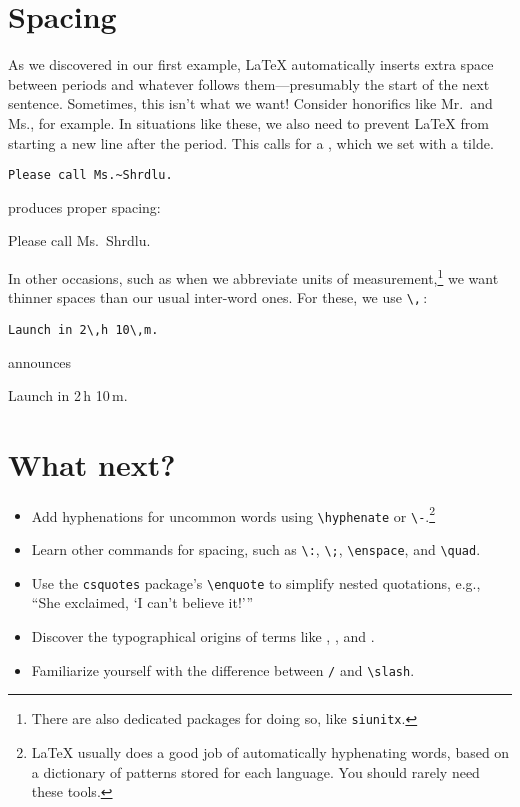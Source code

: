 \section{Spacing}

As we discovered in our first example,
\LaTeX{} automatically inserts extra space between periods and whatever
follows them---presumably the start of the next sentence.
Sometimes, this isn't what we want!
Consider honorifics like Mr.\ and Ms., for example.
In situations like these, we also need to prevent \LaTeX{} from starting a
new line after the period.
This calls for a , which we set with a tilde.
\begin{leftfigure}
\begin{lstlisting}
Please call Ms.~Shrdlu.
\end{lstlisting}
\end{leftfigure}
produces proper spacing:
\begin{leftfigure}
\lm%
Please call Ms.~Shrdlu.
\end{leftfigure}

In other occasions, such as when we abbreviate units of
measurement,\punckern\footnote{There are also dedicated packages for doing so,
like \texttt{siunitx}.}
we want thinner spaces than our usual inter-word ones.
For these, we use \verb|\,|\,:
\begin{leftfigure}
\begin{lstlisting}
Launch in 2\,h 10\,m.
\end{lstlisting}
\end{leftfigure}
announces
\begin{leftfigure}
\lm%
Launch in 2\,h 10\,m.
\end{leftfigure}

\section{What next?}
\begin{itemize}
\item Add hyphenations for uncommon words using \verb|\hyphenate|
    or \verb|\-|.\punckern\footnote{\LaTeX{} usually does a good
    job of automatically hyphenating words, based on a dictionary of patterns
    stored for each language. You should rarely need these tools.}
\item Learn other commands for spacing, such as \verb|\:|, \verb|\;|,
    \verb|\enspace|, and \verb|\quad|.
\item Use the \texttt{csquotes} package's \verb|\enquote| to simplify
    nested quotations, e.g., \\
    \enquote{She exclaimed, \enquote{I can't believe it!}}
\item Discover the typographical origins of terms like ,
    , and .
\item Familiarize yourself with the difference between \texttt{/} and
    \verb|\slash|.
\end{itemize}
